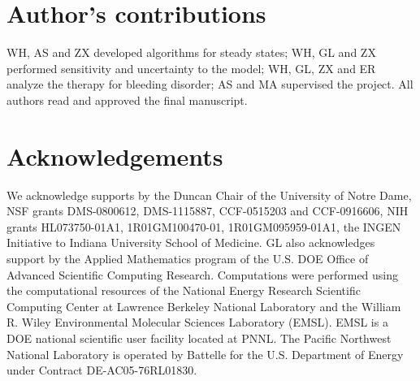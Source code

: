\documentclass[10pt]{bmc_article}
\newenvironment{bmcformat}{\baselineskip20pt\sloppy\setboolean{publ}{false}}{\baselineskip20pt\sloppy}
\begin{document}
\begin{bmcformat}






\bigskip

\section*{Author's contributions}
WH, AS and ZX developed algorithms for steady states; WH, GL and ZX
performed sensitivity and uncertainty to the model; WH, GL, ZX and
ER analyze the therapy for bleeding disorder; AS and MA supervised
the project. All authors read and approved the final manuscript.

\section*{Acknowledgements}
We acknowledge supports by the Duncan Chair of the University of
Notre Dame, NSF grants DMS-0800612, DMS-1115887, CCF-0515203 and
CCF-0916606, NIH grants HL073750-01A1, 1R01GM100470-01,
1R01GM095959-01A1,  the INGEN Initiative to Indiana University
School of Medicine. GL also acknowledges support by the Applied
Mathematics program of the U.S. DOE Office of Advanced Scientific
Computing Research. Computations were performed using the
computational resources of the National Energy Research Scientific
Computing Center at Lawrence Berkeley National Laboratory and the
William R. Wiley Environmental Molecular Sciences Laboratory (EMSL).
EMSL is a DOE national scientific user facility located at PNNL. The
Pacific Northwest National Laboratory is operated by Battelle for
the U.S. Department of Energy under Contract DE-AC05-76RL01830.

\newpage





\clearpage



\clearpage






\end{bmcformat}
\end{document}
